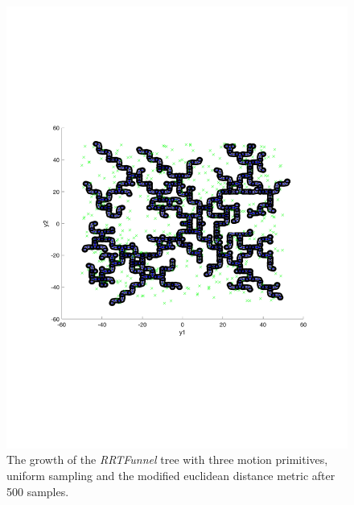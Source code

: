 \begin{figure}
  \includegraphics[scale=.5]{figures/rrtfunnel/rrtfunnel-modified-euclidean-500samples}
  \caption{The growth of the \textit{RRTFunnel} tree with three motion
    primitives, uniform sampling and the modified euclidean distance metric
    after 500 samples.}
\end{figure}

